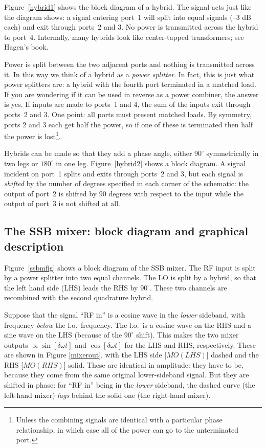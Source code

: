 \documentclass[11pt,preprint]{aastex}
\begin{document}
        Figure\ \ref{hybrid1} shows the block diagram of a hybrid.  The
signal acts just like the diagram shows: a signal entering port\ 1 will
split into equal signals (--3 dB each) and exit through ports\ 2 and 3.
No power is transmitted across the hybrid to port\ 4.  Internally, many
hybrids look like center-tapped transformers; see Hagen's book.

        Power is split between the two adjacent ports and nothing is
transmitted across it.  In this way we think of a hybrid as a {\it power
splitter}.  In fact, this is just what power splitters are: a hybrid
with the fourth port terminated in a matched load. If you are wondering
if it can be used in reverse as a power combiner, the answer is yes.  If
inputs are made to ports\ 1 and 4, the sum of the inputs exit through
ports\ 2 and 3. One point: all ports must present matched loads. By
symmetry, ports 2 and 3 each get half the power, so if one of these is
terminated then half the power is lost\footnote{Unless the combining
  signals are identical with a particular phase relationship, in which
  case all of the power can go to the unterminated port.}.

        Hybrids can be made so that they add a phase angle, either
$90^\circ$ symmetrically in two legs or $180^\circ$ in one leg.
Figure\ \ref{hybrid2} shows a block diagram.  A signal incident on port\
1
splits and exits through ports\ 2 and 3, but  each signal is
\emph{shifted} by the number of degrees specified in each corner of the
schematic:  the output of port\ 2 is shifted by $90$ degrees with
respect to the input while the
output of port\ 3 is not shifted at all.

\subsection{The SSB mixer: block diagram and graphical description}

Figure\ \ref{ssbmfig} shows a block diagram of the SSB mixer.  The RF
input is split by a power splitter into two equal channels. The LO is
split by a hybrid, so that the left hand side (LHS) leads the RHS by
$90^\circ$.  These two channels are recombined with the second
quadrature hybrid.

Suppose that the signal ``RF in'' is a cosine wave in the {\it lower}
sideband, with frequency {\it below} the l.o.\ frequency. The l.o.\ is a
cosine wave on the RHS and a sine wave on the LHS (because of the
$90^\circ$ shift). This makes the two mixer outputs $\propto \sin
[\delta \omega t]$ and $\cos [\delta \omega t]$ for the LHS and RHS,
respectively. These are shown in Figure \ref{mixerout}, with the LHS
side [$MO(LHS)$] dashed and the RHS [$MO(RHS)$] solid. These are
identical in amplitude: they have to be, because they come from the same
original lower-sideband signal. But they are shifted in phase: for ``RF
in'' being in the {\it lower} sideband, the dashed curve (the left-hand
mixer) {\it lags} behind the solid one (the right-hand mixer).
\end{document}
